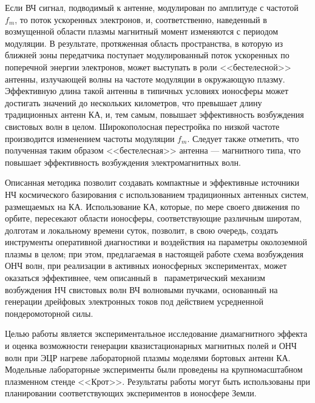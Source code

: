 \documentclass[autoref,10pt]{disser}
\begin{document}
Если ВЧ сигнал, подводимый к антенне, модулирован по амплитуде с частотой $f_{m}$, то поток ускоренных электронов, и, соответственно, наведенный в возмущенной области плазмы магнитный момент изменяются с периодом модуляции. В результате, протяженная область пространства, в которую из ближней зоны передатчика поступает модулированный поток ускоренных по поперечной энергии электронов, может выступать в роли <<бестелесной>> антенны, излучающей волны на частоте модуляции в окружающую плазму. Эффективную длина такой антенны в типичных условиях ионосферы может достигать значений до нескольких километров, что превышает длину традиционных антенн КА, и, тем самым, повышает эффективность возбуждения свистовых волн в целом. Широкополосная перестройка по низкой частоте производится изменением частоты модуляции $f_{m}$. Следует также отметить, что полученная таким образом <<бестелесная>> антенна --- магнитного типа, что повышает эффективность возбуждения электромагнитных волн.

Описанная методика позволит создавать компактные и эффективные источники НЧ космического базирования с использованием традиционных антенных систем, размещаемых на КА. Использование КА, которые, по мере своего движения по орбите, пересекают  области ионосферы, соответствующие различным широтам, долготам и локальному времени суток, позволит, в свою очередь, создать инструменты оперативной диагностики и воздействия на параметры околоземной плазмы в целом; при этом, предлагаемая в настоящей работе схема возбуждения ОНЧ волн, при реализации в активных ионосферных экспериментах, может оказаться эффективнее, чем описанный  в~\cite{Gushchin} параметрический механизм возбуждения НЧ свистовых волн ВЧ волновыми пучками, основанный на генерации дрейфовых электронных токов под действием усредненной пондеромоторной силы.

Целью работы является экспериментальное исследование диамагнитного эффекта и оценка возможности генерации квазистационарных магнитных полей и ОНЧ волн при ЭЦР нагреве лабораторной плазмы моделями бортовых антенн КА. Модельные лабораторные эксперименты были проведены на крупномасштабном плазменном стенде <<Крот>>. Результаты работы могут быть использованы при планировании соответствующих экспериментов в ионосфере Земли.
\end{document}
